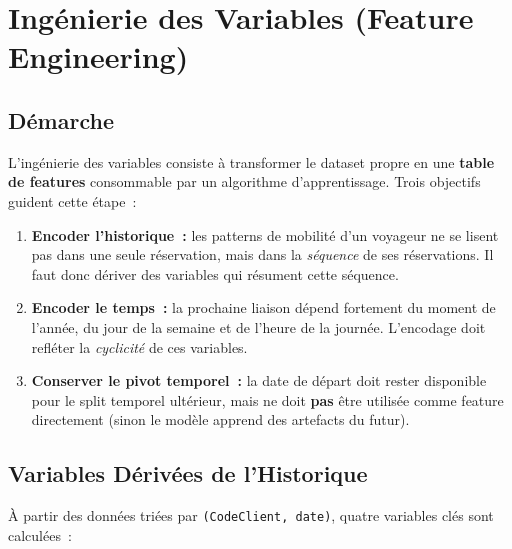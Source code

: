 \documentclass[11pt, a4paper]{article}
\begin{document}
\newpage
\section{Ingénierie des Variables (Feature Engineering)}

\subsection{Démarche}

L'ingénierie des variables consiste à transformer le dataset propre en
une \textbf{table de features} consommable par un algorithme
d'apprentissage. Trois objectifs guident cette étape~:
\begin{enumerate}
\item \textbf{Encoder l'historique~:} les patterns de mobilité d'un
    voyageur ne se lisent pas dans une seule réservation, mais dans la
    \textit{séquence} de ses réservations. Il faut donc dériver des
    variables qui résument cette séquence.
\item \textbf{Encoder le temps~:} la prochaine liaison dépend fortement
    du moment de l'année, du jour de la semaine et de l'heure de la
    journée. L'encodage doit refléter la \textit{cyclicité} de ces
    variables.
\item \textbf{Conserver le pivot temporel~:} la date de départ doit
    rester disponible pour le split temporel ultérieur, mais ne doit
    \textbf{pas} être utilisée comme feature directement (sinon le modèle
    apprend des artefacts du futur).
\end{enumerate}

\subsection{Variables Dérivées de l'Historique}

À partir des données triées par \texttt{(CodeClient, date)},
quatre variables clés sont calculées~:
\end{document}
